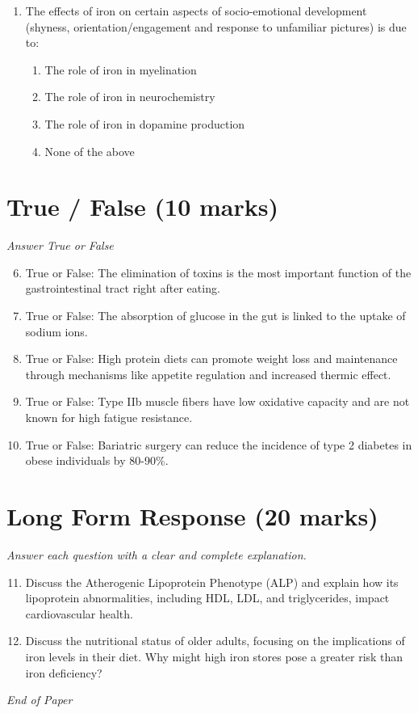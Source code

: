 \documentclass[12pt]{article}
\begin{document}
\begin{enumerate}[label=\arabic*.]
\begin{enumerate}[label=(\alph*)]
    \item Only when intakes are less than those required for nutritional benefits
    \item Under no known conditions of usual intake
\end{enumerate}
\item The effects of iron on certain aspects of socio-emotional development (shyness, orientation/engagement and response to unfamiliar pictures) is due to:
\begin{enumerate}[label=(\alph*)]
    \item The role of iron in myelination
    \item The role of iron in neurochemistry
    \item The role of iron in dopamine production
    \item None of the above
\end{enumerate}
\end{enumerate}

\section*{True / False (10 marks)}
\textit{Answer True or False}
\begin{enumerate}[label=\arabic*.]
\setcounter{enumi}{5}
\item True or False: The elimination of toxins is the most important function of the gastrointestinal tract right after eating.
\item True or False: The absorption of glucose in the gut is linked to the uptake of sodium ions.
\item True or False: High protein diets can promote weight loss and maintenance through mechanisms like appetite regulation and increased thermic effect.
\item True or False: Type IIb muscle fibers have low oxidative capacity and are not known for high fatigue resistance.
\item True or False: Bariatric surgery can reduce the incidence of type 2 diabetes in obese individuals by 80-90\%.
\end{enumerate}

\section*{Long Form Response (20 marks)}
\textit{Answer each question with a clear and complete explanation.}
\begin{enumerate}[label=\arabic*.]
\setcounter{enumi}{10}
\item Discuss the Atherogenic Lipoprotein Phenotype (ALP) and explain how its lipoprotein abnormalities, including HDL, LDL, and triglycerides, impact cardiovascular health.
\item Discuss the nutritional status of older adults, focusing on the implications of iron levels in their diet. Why might high iron stores pose a greater risk than iron deficiency?
\end{enumerate}

\vfill
\noindent\textit{End of Paper}
\end{document}
